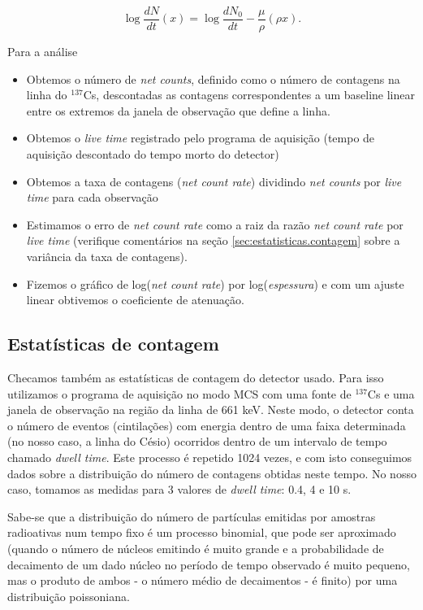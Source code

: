 \documentclass[a4paper, 11pt, notitlepage]{article}
\numberwithin{equation}{section}  %
\begin{document}
$$ \log \frac{dN}{dt}(x) = \log \frac{dN_0}{dt} - \frac{\mu}{\rho} \left(\rho x\right). $$

Para a análise

\begin{itemize}
\item Obtemos o número de \textit{net counts}, definido como o número de contagens na linha do ${}^{137}$Cs, descontadas as contagens correspondentes a um baseline linear entre os extremos da janela de observação que define a linha.
\item Obtemos o \textit{live time} registrado pelo programa de aquisição (tempo de aquisição descontado do tempo morto do detector)
\item Obtemos a taxa de contagens (\textit{net count rate}) dividindo \textit{net counts} por \textit{live time} para cada observação
\item Estimamos o erro de \textit{net count rate} como a raiz da razão \textit{net count rate} por \textit{live time} (verifique  comentários na seção \ref{sec:estatisticas.contagem} sobre a variância da taxa de contagens).
\item Fizemos o gráfico de log(\textit{net count rate}) por log(\textit{espessura}) e com um ajuste linear obtivemos o coeficiente de atenuação.
\end{itemize}

\subsection{Estatísticas de contagem \label{sec:estatisticas.contagem}}

Checamos também as estatísticas de contagem do detector usado. Para isso utilizamos o programa de aquisição no modo MCS com uma fonte de ${}^{137}$Cs e uma janela de observação na região da linha de 661 keV. Neste modo, o detector conta o número de eventos (cintilações) com energia dentro de uma faixa determinada (no nosso caso, a linha do Césio) ocorridos dentro de um intervalo de tempo chamado \textit{dwell time}. Este processo é repetido 1024 vezes, e com isto conseguimos dados sobre a distribuição do número de contagens obtidas neste tempo. No nosso caso, tomamos as medidas para 3 valores de \textit{dwell time}: 0.4, 4 e 10 s.

Sabe-se \cite{ruby1977} que a distribuição do número de partículas emitidas por amostras radioativas num tempo fixo é um processo binomial, que pode ser aproximado (quando o número de núcleos emitindo é muito grande e a probabilidade de decaimento de um dado núcleo no período de tempo observado é muito pequeno, mas o produto de ambos - o número médio de decaimentos - é finito) por uma distribuição poissoniana.
\end{document}
